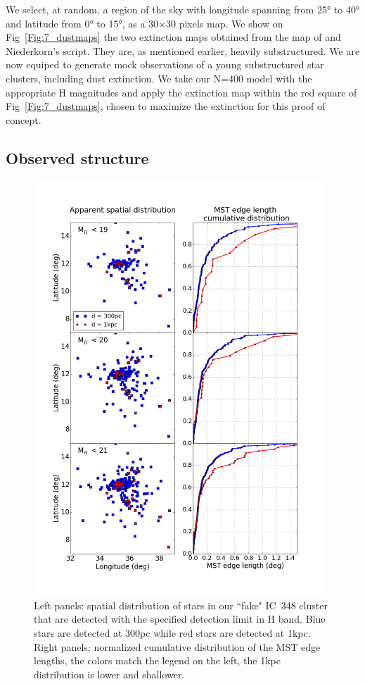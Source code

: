 We select, at random, a region of the sky with longitude spanning from 25° to 40° and latitude from 0° to 15°, as a 30$\times$30 pixels map. We show on Fig~\ref{Fig:7_dustmaps} the two extinction maps obtained from the map of \cite{Green2015} and Niederkorn's script. They are, as mentioned earlier, heavily substructured. We are now equiped to generate mock observations of a young substructured star clusters, including dust extinction. We take our \HubLem N=400 model with the appropriate H magnitudes and apply the extinction map within the red square of Fig~\ref{Fig:7_dustmaps}, chosen to maximize the extinction for this proof of concept.

\subsection*{Observed structure}


\begin{figure}
\begin{center}
\includegraphics[width=0.98\textwidth]{Figures/7_MSTedge.png}
\end{center}
\caption[Influence of extinction on cumulative distribution of MST edges]{Left panels: spatial distribution of  stars in our ``fake" IC~348 cluster that are detected with the specified detection limit in H band. Blue stars are detected at 300pc while red stars are detected at 1kpc. Right panels: normalized cumulative distribution of the MST edge lengths, the colors match the legend on the left, the 1kpc distribution is lower and shallower.}
\label{Fig:7_MSTedge}
\end{figure} 


